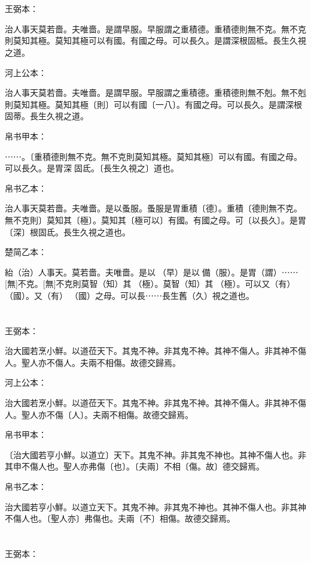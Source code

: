 \documentclass[a5paper]{ctexbook}
\begin{document}
    \chapter{}
    王弼本：

    治人事天莫若嗇。夫唯嗇。是謂早服。早服謂之重積德。重積德則無不克。無不克則莫知其極。莫知其極可以有國。有國之母。可以長久。是謂深根固柢。長生久視之道。

    河上公本：

    治人事天莫若嗇。夫唯嗇。是謂早服。早服謂之重積德。重積德則無不剋。無不剋則莫知其極。莫知其極〔則〕可以有國〔一八〕。有國之母。可以長久。是謂深根固蒂。長生久視之道。

    帛书甲本：

    ⋯⋯。〔重積德則無不克。無不克則莫知其極。莫知其極〕可以有國。有國之母。可以長久。是胃深󱁆固氐。〔長生久視之〕道也。

    帛书乙本：

    治人事天莫若嗇。夫唯嗇。是以蚤服。蚤服是胃重積〔德〕。重積〔德則無不克。無不克則〕莫知其〔極〕。莫知其〔極可以〕有國。有國之母。可〔以長久〕。是胃〔深〕根固氐。長生久視之道也。

    楚简乙本：

    紿（治）人事天。莫若嗇。夫唯嗇。是以󶵙（早）是以󶵙備（服）。是胃（謂）⋯⋯[無]不克。[無]不克則莫智（知）其𠄨（極）。莫智（知）其𠄨（極）。可以又（有）󼷜（國）。又（有）󼷜（國）之母。可以長⋯⋯長生舊（久）視之道也。

    \chapter{}
    王弼本：

    治大國若烹小鮮。以道莅天下。其鬼不神。非其鬼不神。其神不傷人。非其神不傷人。聖人亦不傷人。夫兩不相傷。故德交歸焉。

    河上公本：

    治大國若烹小鮮。以道莅天下。其鬼不神。非其鬼不神。其神不傷人。非其神不傷人。聖人亦不傷〔人〕。夫兩不相傷。故德交歸焉。

    帛书甲本：

    〔治大國若亨小鮮。以道立〕天下。其鬼不神。非其鬼不神也。其神不傷人也。非其申不傷人也。聖人亦弗傷〔也〕。〔夫兩〕不相〔傷。故〕德交歸焉。

    帛书乙本：

    治大國若亨小鮮。以道立天下。其鬼不神。非其鬼不神也。其神不傷人也。非其神不傷人也。〔聖人亦〕弗傷也。夫兩〔不〕相傷。故德交歸焉。

    \chapter{}
    王弼本：
\end{document}
